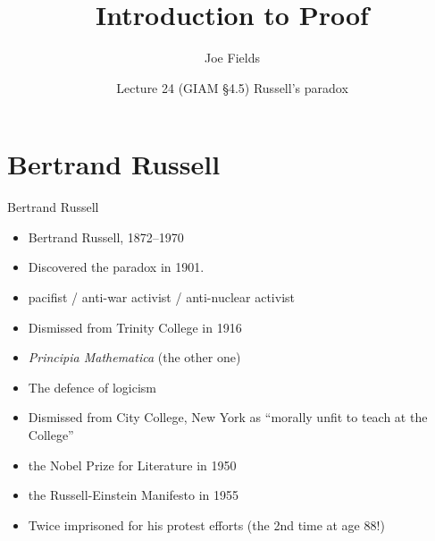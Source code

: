\documentclass[handout,landscape]{beamer}
\author{Joe Fields}
\title{Introduction to Proof}
\date{Lecture 24 (GIAM \S 4.5) \newline Russell's paradox}
\institute[SCSU]{ {\tt fieldsj1@southernct.edu} }
\begin{document}
\begin{frame}[plain]
  \titlepage
\end{frame}

\section{Bertrand Russell}

{ %
\begin{frame}[plain]
\rule{0pt}{0pt}
\end{frame} 
} %


\begin{frame}{Bertrand Russell}
\begin{itemize}
\item Bertrand Russell, 1872--1970\pause
\item Discovered the paradox in 1901. \pause
\item pacifist / anti-war activist / anti-nuclear activist \pause
\item Dismissed from Trinity College in 1916 \pause
\item {\em Principia Mathematica} \pause (the other one) \pause
\item The defence of logicism \pause
\item Dismissed from City College, New York as ``morally unfit to teach at the College''\pause
\item the Nobel Prize for Literature in 1950 \pause
\item the Russell-Einstein Manifesto in 1955 \pause
\item Twice imprisoned for his protest efforts (the 2nd time at age 88!) 
\end{itemize}
\end{frame}
\end{document}
